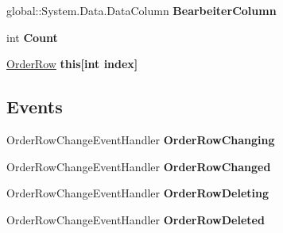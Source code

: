 \begin{DoxyCompactItemize}
\item 
global\+::\+System.\+Data.\+Data\+Column {\bfseries Bearbeiter\+Column}\hypertarget{class_products_1_1_data_1_1ds_sage_1_1_order_data_table_ae99a05e8ea72fd147a3b3080cb1f257b}{}\label{class_products_1_1_data_1_1ds_sage_1_1_order_data_table_ae99a05e8ea72fd147a3b3080cb1f257b}

\item 
int {\bfseries Count}\hypertarget{class_products_1_1_data_1_1ds_sage_1_1_order_data_table_a0e21c3c5db0ad5110a068d43d09997e3}{}\label{class_products_1_1_data_1_1ds_sage_1_1_order_data_table_a0e21c3c5db0ad5110a068d43d09997e3}

\item 
\hyperlink{class_products_1_1_data_1_1ds_sage_1_1_order_row}{Order\+Row} {\bfseries this\mbox{[}int index\mbox{]}}\hypertarget{class_products_1_1_data_1_1ds_sage_1_1_order_data_table_a376a763abd40a51e38bd738273d004d4}{}\label{class_products_1_1_data_1_1ds_sage_1_1_order_data_table_a376a763abd40a51e38bd738273d004d4}

\end{DoxyCompactItemize}
\subsection*{Events}
\begin{DoxyCompactItemize}
\item 
Order\+Row\+Change\+Event\+Handler {\bfseries Order\+Row\+Changing}\hypertarget{class_products_1_1_data_1_1ds_sage_1_1_order_data_table_ab345880f2ff500a1302d6aca7d9744f0}{}\label{class_products_1_1_data_1_1ds_sage_1_1_order_data_table_ab345880f2ff500a1302d6aca7d9744f0}

\item 
Order\+Row\+Change\+Event\+Handler {\bfseries Order\+Row\+Changed}\hypertarget{class_products_1_1_data_1_1ds_sage_1_1_order_data_table_a1b2d33f727481009d7fe556577419edc}{}\label{class_products_1_1_data_1_1ds_sage_1_1_order_data_table_a1b2d33f727481009d7fe556577419edc}

\item 
Order\+Row\+Change\+Event\+Handler {\bfseries Order\+Row\+Deleting}\hypertarget{class_products_1_1_data_1_1ds_sage_1_1_order_data_table_a5178050e71bc412eb719d3cbdde1e86b}{}\label{class_products_1_1_data_1_1ds_sage_1_1_order_data_table_a5178050e71bc412eb719d3cbdde1e86b}

\item 
Order\+Row\+Change\+Event\+Handler {\bfseries Order\+Row\+Deleted}\hypertarget{class_products_1_1_data_1_1ds_sage_1_1_order_data_table_adb9533d6c36a547035ae1be654036b2b}{}\label{class_products_1_1_data_1_1ds_sage_1_1_order_data_table_adb9533d6c36a547035ae1be654036b2b}

\end{DoxyCompactItemize}


